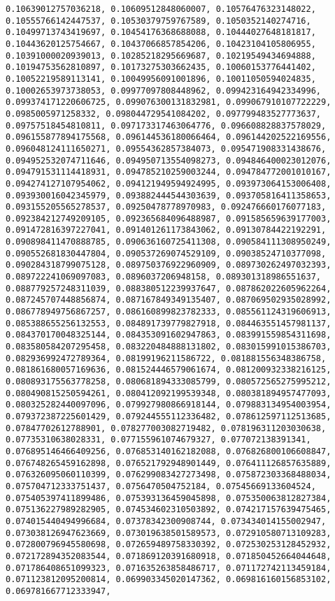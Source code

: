 \documentclass[11pt]{article}
\begin{document}
\begin{Verbatim}[commandchars=\\\{\}]
0.10639012757036218, 0.10609512848060007, 0.10576476323148022, 0.10555766142447537, 0.10530379759767589, 0.1050352140274716, 0.10499713743419697, 0.10454176368688088, 0.10444027648181817, 0.10443620125754667, 0.10437066857854206, 0.10423104105806955, 0.10391000020939013, 0.10285218295669687, 0.10219549434694888, 0.10194753562810897, 0.10173275303662435, 0.10060153776441402, 0.10052219589113141, 0.10049956091001896, 0.10011050594024835, 0.10002653973738053, 0.09977097808448962, 0.099423164942334996, 0.099374171220606725, 0.099076300131832981, 0.099067910107722229, 0.0985005971258332, 0.098044729541084202, 0.097799483527773637, 0.09757518454810811, 0.097173317463064776, 0.096608828837578029, 0.096155877894175568, 0.096144536180066464, 0.096144202522169556, 0.096048124111650271, 0.09554362857384073, 0.095471908331438676, 0.094952532074711646, 0.094950713554098273, 0.094846400023012076, 0.094791531114418931, 0.094785210259003244, 0.094784772001010167, 0.094274127107954062, 0.094121949594924995, 0.093973064153006408, 0.093930016042345979, 0.093882444544303639, 0.093705816411358653, 0.093155205565278537, 0.09250478778970983, 0.092476660176077183, 0.092384212749209105, 0.092365684096488987, 0.091585659639177003, 0.091472816397227041, 0.091401261173843062, 0.09130784422192291, 0.090898411470888785, 0.090636160725411308, 0.090584111308950249, 0.090552681830447804, 0.090537269074529109, 0.09038524710377098, 0.090284318799075128, 0.089750376922960909, 0.089730262497032393, 0.089722241069097083, 0.0896037206948158, 0.089301318986551637, 0.088779257248311039, 0.088380512239937647, 0.087862022605962264, 0.087245707448856874, 0.087167849349135407, 0.087069502935028992, 0.086778949756867257, 0.086160899823782333, 0.085561124319606913, 0.085388655256132553, 0.084891739779827918, 0.084463551457981137, 0.084370170048325144, 0.084353091602947863, 0.083991559854311698, 0.083580584207295458, 0.083220484888131802, 0.083015991015386703, 0.082936992472789364, 0.08199196211586722, 0.081881556348386758, 0.081861680057169636, 0.081524446579061674, 0.081200932338216125, 0.080893175563778258, 0.080681894333085799, 0.080572565275995212, 0.080490815250594261, 0.080412092199539348, 0.080381894957477093, 0.080325282440097096, 0.079927980866918144, 0.079883134954003954, 0.079372387225601429, 0.079244555112336482, 0.078612597112513685, 0.07847702612788901, 0.078277003082719482, 0.078196311203030638, 0.07735310638028331, 0.077155961074679327, 0.077072138391341, 0.076895146466409256, 0.076853140162182088, 0.076826800106608847, 0.076748265459162898, 0.076521792948901449, 0.076411126857635889, 0.076326095060110399, 0.076299083427273498, 0.075872303368488034, 0.075704712333751437, 0.0756470504752184, 0.07545669133604524, 0.075405397411899486, 0.075393136459045898, 0.075350063812827384, 0.075136227989282905, 0.074534602310503892, 0.074217157639475465, 0.074015440494996684, 0.07378342300908744, 0.073434014155002947, 0.073038126947623669, 0.073019638501589573, 0.072910580713109283, 0.072800796945580698, 0.072659489758330392, 0.072530253128452932, 0.072172894352083544, 0.071869120391680918, 0.071850452664044648, 0.071786408651099323, 0.071635263858486717, 0.071172742113459184, 0.071123812095200814, 0.069903345020147362, 0.069816160156853102, 0.069781667712333947, 
\end{Verbatim}
\end{document}
